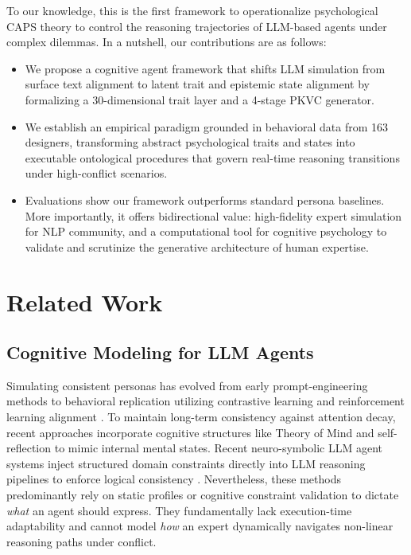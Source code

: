 \documentclass[11pt]{article}
\begin{document}
To our knowledge, this is the first framework to operationalize psychological CAPS theory to control the reasoning trajectories of LLM-based agents under complex dilemmas. In a nutshell, our contributions are as follows:
\vspace{-0.1in}
\begin{itemize}
\item We propose a cognitive agent framework that shifts LLM simulation from surface text alignment to latent trait and epistemic state alignment by formalizing a 30-dimensional trait layer and a 4-stage PKVC generator.
\vspace{-0.1in}
\item We establish an empirical paradigm grounded in behavioral data from 163 designers, transforming abstract psychological traits and states into executable ontological procedures that govern real-time reasoning transitions under high-conflict scenarios.
\vspace{-0.1in}
\item Evaluations show our framework outperforms standard persona baselines. More importantly, it offers bidirectional value: high-fidelity expert simulation for NLP community, and a computational tool for cognitive psychology to validate and scrutinize the generative architecture of human expertise.
\end{itemize}

\section{Related Work}
\subsection{Cognitive Modeling for LLM Agents}
Simulating consistent personas has evolved from early prompt-engineering methods \cite{han2022meet,shanahan2023role} to behavioral replication utilizing contrastive learning and reinforcement learning alignment \cite{ji2025enhancing,wang2025raiden,wang2025know}. To maintain long-term consistency against attention decay, recent approaches incorporate cognitive structures like Theory of Mind \cite{cross2025hypothetical,wen2026tracing} and self-reflection \cite{bai2026irote} to mimic internal mental states. Recent neuro-symbolic LLM agent systems inject structured domain constraints directly into LLM reasoning pipelines to enforce logical consistency \cite{banerjee2025crane,shi2025constraintllm,seo2026toward,labre2026ontology}. Nevertheless, these methods predominantly rely on static profiles or cognitive constraint validation to dictate \textit{what} an agent should express. They fundamentally lack execution-time adaptability and cannot model \textit{how} an expert dynamically navigates non-linear reasoning paths under conflict. 
\end{document}
